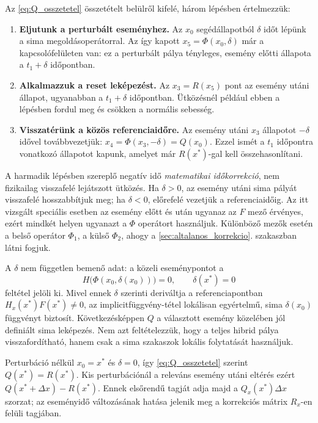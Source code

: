 Az \eqref{eq:Q_osszetetel} összetételt belülről kifelé, három lépésben értelmezzük:
\begin{enumerate}
\item \textbf{Eljutunk a perturbált eseményhez.} Az $x_0$ segédállapotból $\delta$ időt lépünk a sima megoldásoperátorral. Az így kapott $x_5=\Phi(x_0,\delta)$ már a kapcsolófelületen van: ez a perturbált pálya tényleges, esemény előtti állapota a $t_1+\delta$ időpontban.
\item \textbf{Alkalmazzuk a reset leképezést.} Az $x_3=R(x_5)$ pont az esemény utáni állapot, ugyanabban a $t_1+\delta$ időpontban. Ütközésnél például ebben a lépésben fordul meg és csökken a normális sebesség.
\item \textbf{Visszatérünk a közös referenciaidőre.} Az esemény utáni $x_3$ állapotot $-\delta$ idővel továbbvezetjük: $x_4=\Phi(x_3,-\delta)=Q(x_0)$. Ezzel ismét a $t_1$ időpontra vonatkozó állapotot kapunk, amelyet már $R(x^*)$-gal kell összehasonlítani.
\end{enumerate}
A harmadik lépésben szereplő negatív idő \emph{matematikai időkorrekció}, nem fizikailag visszafelé lejátszott ütközés. Ha $\delta>0$, az esemény utáni sima pályát visszafelé hosszabbítjuk meg; ha $\delta<0$, előrefelé vezetjük a referenciaidőig. Az itt vizsgált speciális esetben az esemény előtt és után ugyanaz az $F$ mező érvényes, ezért mindkét helyen ugyanazt a $\Phi$ operátort használjuk. Különböző mezők esetén a belső operátor $\Phi_1$, a külső $\Phi_2$, ahogy a \ref{sec:altalanos_korrekcio}. szakaszban látni fogjuk.

A $\delta$ nem független bemenő adat: a közeli eseménypontot a
\[
H\bigl(\Phi(x_0,\delta(x_0))\bigr)=0,\qquad \delta(x^*)=0
\]
feltétel jelöli ki. Mivel ennek $\delta$ szerinti deriváltja a referenciapontban $H_x(x^*)F(x^*)\neq0$, az implicitfüggvény-tétel lokálisan egyértelmű, sima $\delta(x_0)$ függvényt biztosít. Következésképpen $Q$ a választott esemény közelében jól definiált sima leképezés. Nem azt feltételezzük, hogy a teljes hibrid pálya visszafordítható, hanem csak a sima szakaszok lokális folytatását használjuk.

Perturbáció nélkül $x_0=x^*$ és $\delta=0$, így \eqref{eq:Q_osszetetel} szerint $Q(x^*)=R(x^*)$. Kis perturbációnál a releváns esemény utáni eltérés ezért $Q(x^*+\Delta x)-R(x^*)$. Ennek elsőrendű tagját adja majd a $Q_x(x^*)\Delta x$ szorzat; az eseményidő változásának hatása jelenik meg a korrekciós mátrix $R_x$-en felüli tagjában.


